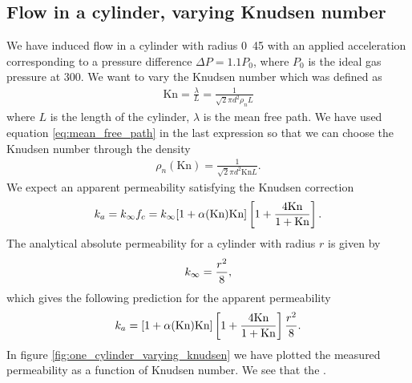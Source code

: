 \subsection{Flow in a cylinder, varying Knudsen number}
We have induced flow in a cylinder with radius \unit{0.45}{\micro\meter} with an applied acceleration corresponding to a pressure difference $\Delta P = 1.1P_0$, where $P_0$ is the ideal gas pressure at \unit{300}{\kelvin}. We want to vary the Knudsen number which was defined as
\begin{align}
	\text{Kn} = \frac{\lambda}{L} = \frac{1}{\sqrt 2 \pi d^2 \rho_n L}
\end{align}
where $L$ is the length of the cylinder, $\lambda$ is the mean free path. We have used equation \eqref{eq:mean_free_path} in the last expression so that we can choose the Knudsen number through the density
\begin{align}
	\rho_n(\text{Kn}) = \frac{1}{\sqrt 2 \pi d^2 \text{Kn}L}.
\end{align}
We expect an apparent permeability satisfying the Knudsen correction
\begin{align}
	k_a = k_\infty f_c = k_\infty[1 + \alpha(\text{Kn})\text{Kn}]\left[1 + {4\text{Kn}\over 1 + \text{Kn}}\right].
\end{align}
The analytical absolute permeability for a cylinder with radius $r$ is given by\cite{karniadakis2005microflows}
\begin{align}
	\label{eq:permeability_cylinder}
	k_\infty = {r^2\over 8},
\end{align}
which gives the following prediction for the apparent permeability
\begin{align}
	k_a = [1 + \alpha(\text{Kn})\text{Kn}]\left[1 + {4\text{Kn}\over 1 + \text{Kn}}\right] {r^2\over 8}.
\end{align}
In figure \ref{fig:one_cylinder_varying_knudsen} we have plotted the measured permeability as a function of Knudsen number. We see that the .

